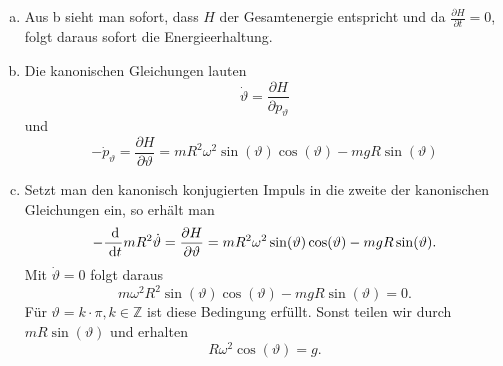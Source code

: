 \documentclass{article}
\theoremstyle{definition}
\newcommand{\Z}{\mathbb{Z}}
\renewcommand{\theta}{\vartheta}
\begin{document}
\begin{enumerate}[(a)]
    \item Aus b sieht man sofort, dass $H$ der Gesamtenergie entspricht und da $\frac{\partial H}{\partial t} = 0$, folgt daraus sofort die Energieerhaltung.
    \item Die kanonischen Gleichungen lauten
    $$\dot \theta = \frac{\partial H}{\partial p_\theta}$$ und $$-\dot p_\theta = \frac{\partial H}{\partial \theta} = mR^2\omega^2\sin(\theta)\cos(\theta) - mgR \sin(\theta)$$
    \item Setzt man den kanonisch konjugierten Impuls in die zweite der kanonischen Gleichungen ein, so erhält man
    $$- \frac{\d}{\d t}mR^2 \dot \theta = \frac{\partial H}{\partial \theta} = mR^2\omega^2\sin(\theta)\cos(\theta) - mgR \sin(\theta).$$ Mit $\dot \theta = 0$ folgt daraus
    $$m\omega^2R^2\sin(\theta)\cos(\theta) - mgR \sin(\theta) = 0.$$
    Für $\theta = k\cdot \pi, k \in \Z$ ist diese Bedingung erfüllt. Sonst teilen wir durch $mR\sin(\theta)$ und erhalten
    $$R\omega^2\cos(\theta) = g.$$
\end{enumerate}
\end{document}
